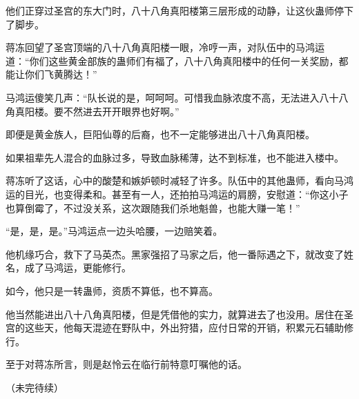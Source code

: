 \begin{this_body}
他们正穿过圣宫的东大门时，八十八角真阳楼第三层形成的动静，让这伙蛊师停下了脚步。

蒋冻回望了圣宫顶端的八十八角真阳楼一眼，冷哼一声，对队伍中的马鸿运道：“你们这些黄金部族的蛊师们有福了，八十八角真阳楼中的任何一关奖励，都能让你们飞黄腾达！”

马鸿运傻笑几声：“队长说的是，呵呵呵。可惜我血脉浓度不高，无法进入八十八角真阳楼。要不然进去开开眼界也好啊。”

即便是黄金族人，巨阳仙尊的后裔，也不一定能够进出八十八角真阳楼。

如果祖辈先人混合的血脉过多，导致血脉稀薄，达不到标准，也不能进入楼中。

蒋冻听了这话，心中的酸楚和嫉妒顿时减轻了许多。队伍中的其他蛊师，看向马鸿运的目光，也变得柔和。甚至有一人，还拍拍马鸿运的肩膀，安慰道：“你这小子也算倒霉了，不过没关系，这次跟随我们杀地魁兽，也能大赚一笔！”

“是，是，是。”马鸿运点一边头哈腰，一边赔笑着。

他机缘巧合，救下了马英杰。黑家强招了马家之后，他一番际遇之下，就改变了姓名，成了马鸿运，更能修行。

如今，他只是一转蛊师，资质不算低，也不算高。

他当然能进出八十八角真阳楼，但是凭借他的实力，就算进去了也没用。居住在圣宫的这些天，他每天混迹在野队中，外出狩猎，应付日常的开销，积累元石辅助修行。

至于对蒋冻所言，则是赵怜云在临行前特意叮嘱他的话。

（未完待续）

\end{this_body}


